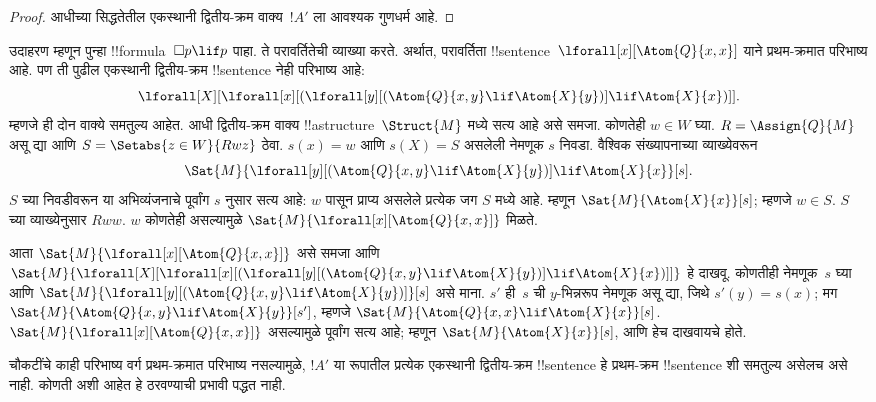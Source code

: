 \documentclass[../../../include/open-logic-section]{subfiles}
\begin{document}
\begin{proof}
  आधीच्या सिद्धतेतील एकस्थानी द्वितीय-क्रम
  वाक्य~$!A'$ ला आवश्यक गुणधर्म आहे.
\end{proof}

उदाहरण म्हणून पुन्हा !!{formula}~$\Box p \lif p$
पाहा. ते परावर्तितेची व्याख्या करते. अर्थात,
परावर्तिता !!{sentence}~$\lforall[x][\Atom{Q}{x,x}]$
याने प्रथम-क्रमात परिभाष्य आहे. पण ती पुढील
एकस्थानी द्वितीय-क्रम !!{sentence} नेही
परिभाष्य आहे:
\[
\lforall[X][\lforall[x][(\lforall[y][(\Atom{Q}{x,y} \lif \Atom{X}{y})]
    \lif \Atom{X}{x})]].
\]
म्हणजे ही दोन वाक्ये समतुल्य आहेत. आधी द्वितीय-क्रम वाक्य
!!a{structure}~$\Struct{M}$ मध्ये सत्य आहे असे समजा.
कोणतेही $w \in W$ घ्या. $R=\Assign{Q}{M}$ असू द्या आणि
$S=\Setabs{z \in W}{Rwz}$ ठेवा. $s(x)=w$ आणि $s(X)=S$
असलेली नेमणूक $s$ निवडा. वैश्विक संख्यापनाच्या व्याख्येवरून
\[
\Sat{M}{\lforall[y][(\Atom{Q}{x,y} \lif \Atom{X}{y})]
    \lif \Atom{X}{x}}[s].
\]
$S$ च्या निवडीवरून या अभिव्यंजनाचे पूर्वांग $s$ नुसार सत्य आहे:
$w$ पासून प्राप्य असलेले प्रत्येक जग $S$ मध्ये आहे.
म्हणून $\Sat{M}{\Atom{X}{x}}[s]$; म्हणजे $w \in S$.
$S$ च्या व्याख्येनुसार $Rww$. $w$ कोणतेही असल्यामुळे
$\Sat{M}{\lforall[x][\Atom{Q}{x,x}]}$ मिळते.

आता $\Sat{M}{\lforall[x][\Atom{Q}{x,x}]}$
असे समजा आणि
$\Sat{M}{\lforall[X][\lforall[x][(\lforall[y][(\Atom{Q}{x,y} \lif
        \Atom{X}{y})] \lif \Atom{X}{x})]]}$
हे दाखवू. कोणतीही नेमणूक~$s$ घ्या आणि
$\Sat{M}{\lforall[y][(\Atom{Q}{x,y} \lif
    \Atom{X}{y})]}[s]$ असे माना. $s'$ ही~$s$
ची $y$-भिन्नरूप नेमणूक असू द्या, जिथे $s'(y)
= s(x)$; मग
$\Sat{M}{\Atom{Q}{x,y} \lif \Atom{X}{y}}[s']$,
म्हणजे $\Sat{M}{\Atom{Q}{x,x} \lif \Atom{X}{x}}[s]$.
$\Sat{M}{\lforall[x][\Atom{Q}{x,x}]}$ असल्यामुळे
पूर्वांग सत्य आहे; म्हणून $\Sat{M}{\Atom{X}{x}}[s]$,
आणि हेच दाखवायचे होते.

चौकटींचे काही परिभाष्य वर्ग प्रथम-क्रमात परिभाष्य
नसल्यामुळे, $!A'$ या रूपातील प्रत्येक एकस्थानी
द्वितीय-क्रम !!{sentence} हे प्रथम-क्रम
!!{sentence} शी समतुल्य असेलच असे नाही.
कोणती अशी आहेत हे ठरवण्याची प्रभावी पद्धत नाही.
\end{document}
